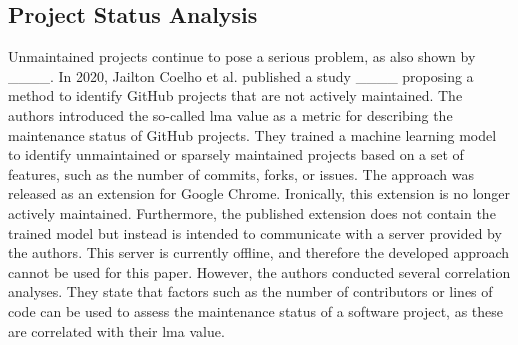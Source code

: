 \subsection{Project Status Analysis}


Unmaintained projects continue to pose a serious problem, as also shown by ____.
In 2020, Jailton Coelho et al. published a study ____ proposing a method to identify GitHub projects that are not actively maintained.
The authors introduced the so-called \gls{lma} value as a metric for describing the maintenance status of GitHub projects.
They trained a machine learning model to identify unmaintained or sparsely maintained projects based on a set of features, such as the number of commits, forks, or issues.
The approach was released as an extension for Google Chrome.
Ironically, this extension is no longer actively maintained.
Furthermore, the published extension does not contain the trained model but instead is intended to communicate with a server provided by the authors.
This server is currently offline, and therefore the developed approach cannot be used for this paper.
However, the authors conducted several correlation analyses.
They state that factors such as the number of contributors or lines of code can be used to assess the maintenance status of a software project, as these are correlated with their \gls{lma} value.

